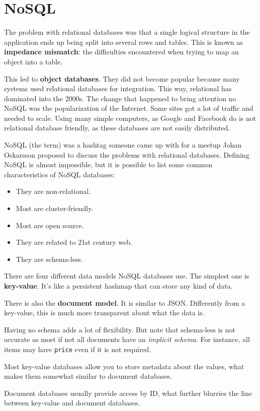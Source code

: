 \documentclass[12pt, oneside]{book}
\begin{document}
\section{NoSQL}
The problem with relational databases was that a single logical structure in the
application ends up being split into several rows and tables. This is known as
\textbf{impedance mismatch}: the difficulties encountered when trying to map
an object into a table.

This led to \textbf{object databases}. They did not become popular because many
systems used relational databases for integration. This way, relational has
dominated into the 2000s. The change that happened to bring attention no NoSQL
was the popularization of the Internet. Some sites got a lot of traffic and
needed to scale. Using many simple computers, as Google and Facebook do is not
relational database friendly, as these databases are not easily distributed.

NoSQL (the term) was a hashtag someone came up with for a meetup Johan
Oskarsson proposed to discuss the problems with relational databases. Defining
NoSQL is almost impossible, but it is possible to list some common
characteristics of NoSQL databases:
\begin{itemize}
 \item They are non-relational.
 \item Most are cluster-friendly.
 \item Most are open source.
 \item They are related to 21st century web.
 \item They are schema-less.
\end{itemize}

There are four different data models NoSQL databases use.
The simplest one is \textbf{key-value}. It's like a persistent hashmap that can
store any kind of data.

There is also the \textbf{document model}. It is similar to JSON. Differently
from a key-value, this is much more transparent about what the data is.

Having no schema adds a lot of flexibility. But note that schema-less is not
accurate as most if not all documents have an \textit{implicit schema}. For
instance, all items may have \texttt{price} even if it is not required.

Most key-value databases allow you to store metadata about the values, what
makes them somewhat similar to document databases.

Document databases usually provide access by ID, what further blurries the line
between key-value and document databases.
\end{document}
